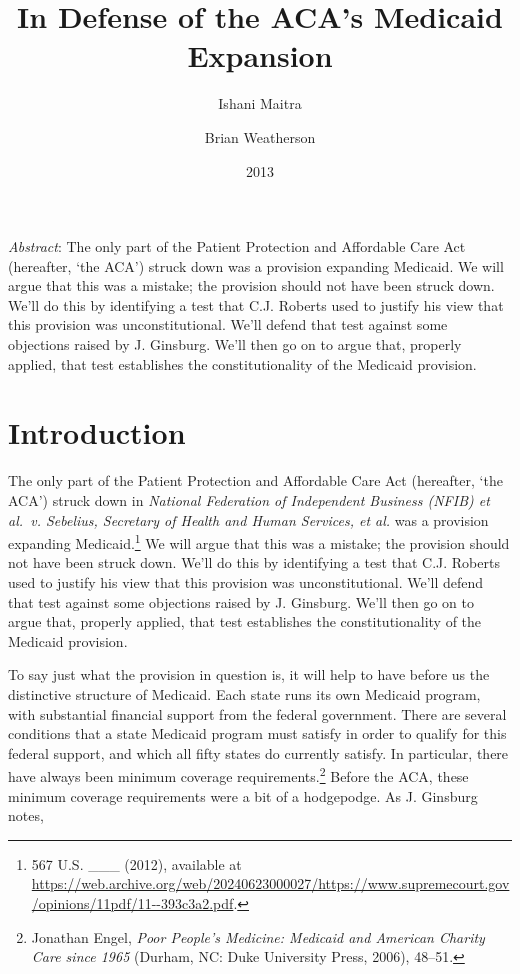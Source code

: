\documentclass[
  11pt,
  letterpaper,
  DIV=11,
  numbers=noendperiod,
  twoside]{scrartcl}
\title{In Defense of the ACA's Medicaid Expansion}
\author{Ishani Maitra \and Brian Weatherson}
\date{2013}
\renewenvironment{abstract}
 {\vspace{-1.25cm}
 \quotation\small\noindent\emph{Abstract}:}
 {\endquotation}
\renewenvironment{abstract}
 {\quotation\small\noindent\emph{Abstract}:}
 {\endquotation\vspace{-0.02cm}}
\begin{document}
\maketitle
\begin{abstract}
The only part of the Patient Protection and Affordable Care Act
(hereafter, `the ACA') struck down was a provision expanding Medicaid.
We will argue that this was a mistake; the provision should not have
been struck down. We'll do this by identifying a test that C.J. Roberts
used to justify his view that this provision was unconstitutional. We'll
defend that test against some objections raised by J. Ginsburg. We'll
then go on to argue that, properly applied, that test establishes the
constitutionality of the Medicaid provision.
\end{abstract}


\section{Introduction}\label{introduction}

The only part of the Patient Protection and Affordable Care Act
(hereafter, `the ACA') struck down in \emph{National Federation of
Independent Business (NFIB) et al.~v. Sebelius, Secretary of Health and
Human Services, et al.} was a provision expanding Medicaid.\footnote{567
  U.S. \_\_\_ (2012), available at
  \url{https://web.archive.org/web/20240623000027/https://www.supremecourt.gov/opinions/11pdf/11--393c3a2.pdf}.}
We will argue that this was a mistake; the provision should not have
been struck down. We'll do this by identifying a test that C.J. Roberts
used to justify his view that this provision was unconstitutional. We'll
defend that test against some objections raised by J. Ginsburg. We'll
then go on to argue that, properly applied, that test establishes the
constitutionality of the Medicaid provision.

To say just what the provision in question is, it will help to have
before us the distinctive structure of Medicaid. Each state runs its own
Medicaid program, with substantial financial support from the federal
government. There are several conditions that a state Medicaid program
must satisfy in order to qualify for this federal support, and which all
fifty states do currently satisfy. In particular, there have always been
minimum coverage requirements.\footnote{Jonathan Engel, \emph{Poor
  People's Medicine: Medicaid and American Charity Care since 1965}
  (Durham, NC: Duke University Press, 2006), 48--51.} Before the ACA,
these minimum coverage requirements were a bit of a hodgepodge. As J.
Ginsburg notes,
\end{document}
